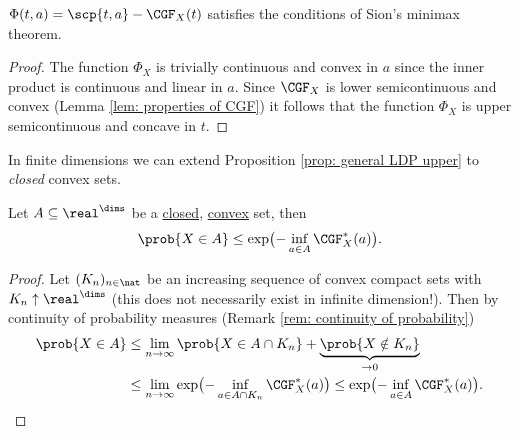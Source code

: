 \begin{lemma}
    \label{lem: check sion's conditions}
    \(\Phi(t, a) = \scp{t, a} - \CGF_X(t)\) satisfies the conditions of Sion's minimax theorem.
\end{lemma}
\begin{proof}
    The function \(\Phi_X\) is trivially continuous and convex in \(a\) since
    the inner product is continuous and linear in \(a\).
    Since \(\CGF_X\) is lower semicontinuous and convex (Lemma \ref{lem:
    properties of CGF}) it follows that
    the function \(\Phi_X\) is upper semicontinuous and concave in \(t\).
\end{proof}

In finite dimensions we can extend Proposition \ref{prop: general LDP upper} to
\emph{closed} convex sets.

\begin{mdframed}[innertopmargin=0pt]
\begin{theorem}
    \label{thm: chernoff bound in R^d}
    Let \(A\subseteq \real^\dims\) be a \underline{closed}, \underline{convex} set, then 
    \[
        \prob{X \in A} \le \exp\bigl(-\inf_{a\in A} \CGF_X^*(a)\bigr).
    \]
\end{theorem}
\end{mdframed}
\begin{proof}
    Let \((K_n)_{n\in \nat}\) be an increasing sequence of convex compact sets
    with \(K_n \uparrow \real^\dims\) (this does not necessarily exist in infinite
    dimension!). Then by continuity of probability measures
    (Remark \ref{rem: continuity of probability})
    \[\begin{aligned}[b]
        \prob{X \in A}
        &\le \lim_{n\to \infty} \prob{X \in A \cap K_n} + \underbrace{\prob{X \notin K_n}}_{\to 0}
        \\
        &\le \lim_{n\to \infty} \exp\bigl(- \inf_{a\in A \cap K_n} \CGF_X^*(a)\bigr)
        \le \exp\bigl(- \inf_{a\in A} \CGF_X^*(a)\bigr).
    \end{aligned}
    \qedhere
    \]
\end{proof}

